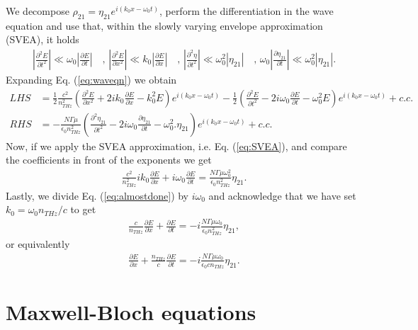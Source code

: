 \documentclass[preprint,secnumarabic,amssymb, nobibnotes, aip, prd]{revtex4-1}
\def\p{\partial}
\begin{document}
We decompose $\rho_{21}=\eta_{21}e^{i(k_0x-\omega_0t)}$, perform the differentiation in the wave equation and use that, within the slowly varying envelope approximation (SVEA), it holds
\begin{align}
\label{eq:SVEA}
\left |\frac{\p^2 E}{\p t^2}\right | \ll \omega_0\left|\frac{\p E}{\p t}\right| \quad \text{, } \left |\frac{\p^2 E}{\p x^2}\right | \ll k_0\left|\frac{\p E}{\p x}\right| \quad \text{, } \left |\frac{\p^2 \eta}{\p t^2}\right | \ll \omega_0^2 \left| \eta_{21}\right| \quad \text{, } \omega_0 \left| \frac{\p \eta_{21}}{\p t}\right| \ll  \omega_0^2\left|\eta_{21}\right|.
\end{align}
Expanding Eq. (\ref{eq:waveqn}) we obtain
\begin{align}
LHS &= \frac{1}{2} \frac{c^2}{n_{THz}^2} \left(\frac{\p^2 E}{\p x^2} +2ik_0 \frac{\p E}{\p x} -k_0^2 E\right)e^{i(k_0x-\omega_0t)} - \frac{1}{2}\left(\frac{\p^2 E}{\p t^2} -2i\omega_0 \frac{\p E}{\p t} -\omega_0^2 E\right)e^{i(k_0x-\omega_0t)} + c.c. \nonumber \\
RHS &= -\frac{N\Gamma\mu}{\epsilon_0 n_{THz}^2} \left(\frac{\p^2 \eta_{21}}{\p t^2} -2i\omega_0 \frac{\p \eta_{21}}{\p t} -\omega_0^2. \eta_{21}\right)e^{i(k_0x-\omega_0t)}+c.c.
\end{align}
Now, if we apply the SVEA approximation, i.e. Eq. (\ref{eq:SVEA}), and compare the coefficients in front of the exponents we get
\begin{align}
\label{eq:almostdone}
\frac{c^2}{n_{THz}^2}ik_0 \frac{\p E}{\p x}+i\omega_0 \frac{\p E}{\p t} = \frac{N\Gamma\mu\omega_0^2}{\epsilon_0 n_{THz}^2}\eta_{21}.
\end{align}
Lastly, we divide Eq. (\ref{eq:almostdone}) by $i\omega_0$ and acknowledge that we have set $k_0 = \omega_0 n_{THz}/c$ to get
\begin{align}
\label{eq:almostdone2}
\frac{c}{n_{THz}} \frac{\p E}{\p x}+ \frac{\p E}{\p t} = -i\frac{N\Gamma\mu\omega_0}{\epsilon_0 n_{THz}^2}\eta_{21},
\end{align}
or equivalently
\begin{align}
\label{eq:almostdone3}
\frac{\p E}{\p x}+ \frac{n_{THz}}{c} \frac{\p E}{\p t} = -i\frac{N\Gamma\mu\omega_0}{\epsilon_0 c n_{THz}}\eta_{21}.
\end{align}

\section{Maxwell-Bloch equations}
\end{document}
